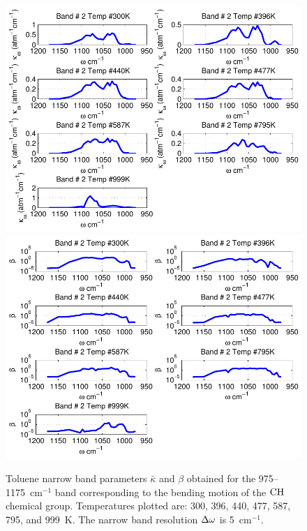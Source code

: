 \begin{figure}[p]
\begin{center}
\includegraphics[width=5.0in]{Figures/Toluene_Kappa_Band2_MALKMUS.pdf}
\includegraphics[width=5.0in]{Figures/Toluene_Beta_Band2_MALKMUS.pdf}
\end{center}
\caption{Toluene narrow band parameters $\bar{\kappa}$ and $\beta$ obtained for the 975--1175~cm$^{-1}$ band corresponding to the bending motion of the $\rm CH$ chemical group. Temperatures plotted are: 300, 396, 440, 477, 587, 795, and 999~K. The narrow band resolution $\Delta \omega$ is 5~cm$^{-1}$.\label{fig:toluene_kappa_beta2}}
\end{figure}


